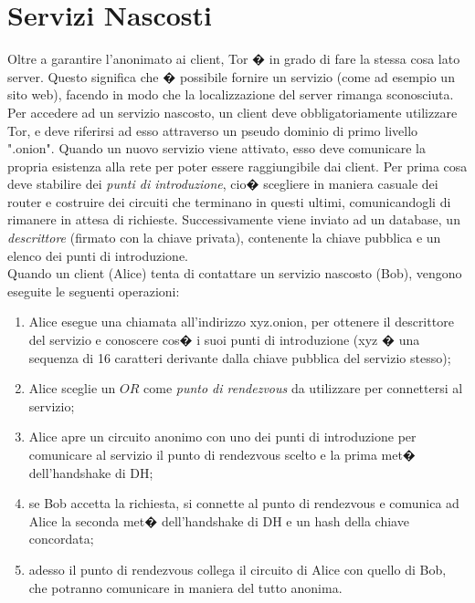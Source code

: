 \section{Servizi Nascosti}
Oltre a garantire l'anonimato ai client, Tor � in grado di fare la stessa cosa lato server. Questo significa che � possibile fornire un servizio (come ad esempio un sito web), facendo in modo che la localizzazione del server rimanga sconosciuta. Per accedere ad un servizio nascosto, un client deve obbligatoriamente utilizzare Tor, e deve riferirsi ad esso attraverso un pseudo dominio di primo livello ".onion". Quando un nuovo servizio viene attivato, esso deve comunicare la propria esistenza alla rete per poter essere raggiungibile dai client. Per prima cosa deve stabilire dei \emph{punti di introduzione}, cio� scegliere in maniera casuale dei router e costruire dei circuiti che terminano in questi ultimi, comunicandogli di rimanere in attesa di richieste. Successivamente viene inviato ad un database, un \emph{descrittore} (firmato con la chiave privata), contenente la chiave pubblica e un elenco dei punti di introduzione.\\ Quando un client (Alice) tenta di contattare un servizio nascosto (Bob), vengono eseguite le seguenti operazioni:
\begin{enumerate}
\item Alice esegue una chiamata all'indirizzo xyz.onion, per ottenere il descrittore del servizio e conoscere cos� i suoi punti di introduzione (xyz � una sequenza di 16 caratteri derivante dalla chiave pubblica del servizio stesso); 
\item Alice sceglie un $OR$ come \emph{punto di rendezvous}  da utilizzare per connettersi al servizio;
\item  Alice apre un circuito anonimo con uno dei punti di introduzione per comunicare al servizio il punto di rendezvous scelto e la prima met� dell'handshake di DH;
\item se Bob accetta la richiesta, si connette al punto di rendezvous e comunica ad Alice la seconda met� dell'handshake di DH e un hash della chiave concordata;
 \item adesso il punto di rendezvous collega il circuito di Alice con quello di Bob, che potranno comunicare in maniera del tutto anonima.
\end{enumerate}




